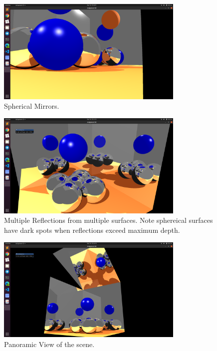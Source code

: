 \documentclass[a4paper]{article}
\begin{document}
\begin{figure}[H]
    \centering
    \includegraphics[width=0.8\textwidth]{Images/CloseUp.png}
    \caption{Spherical Mirrors.}
\end{figure}

\begin{figure}[H]
    \centering
    \includegraphics[width=0.8\textwidth]{Images/LimitsOfMultipleReflection.png}
    \caption{Multiple Reflections from multiple surfaces. Note sphereical surfaces have dark spots when reflections exceed maximum depth.}
\end{figure}

\begin{figure}[H]
    \centering
    \includegraphics[width=0.8\textwidth]{Images/PanoramicView.png}
    \caption{Panoramic View of the scene.}
\end{figure}
\end{document}

